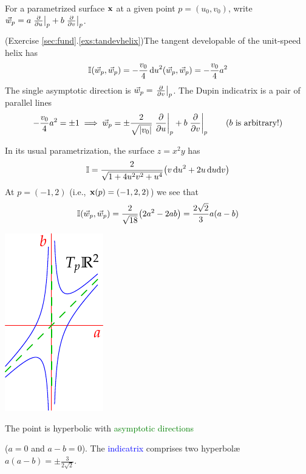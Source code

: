\begin{examples}{}{}
	For a parametrized surface ${\mathbf{x}}$ at a given point $p=(u_0,v_0)$, write $\vec w_p=\smash{a\left.\frac{\partial }{\partial u}\right|_{p}+b\left.\frac{\partial }{\partial v}\right|_{p}}$.
	\begin{enumerate}
	  \item (Exercise \ref*{sec:fund}.\ref{exs:tandevhelix})\lstsp The tangent developable of the unit-speed helix has
		\[
			\mathbb{I}(\vec w_p,\vec w_p) =-\frac{v_0}4\,{\mathrm{d} u}^2(\vec w_p,\vec w_p) =-\frac{v_0}4a^2
		\]
		The single asymptotic direction is $\vec w_p=\smash{\left.\frac{\partial }{\partial v}\right|_{p}}$. The Dupin indicatrix is a pair of parallel lines
		\[
			-\frac{v_0}4a^2=\pm 1\implies \vec w_p=\pm\frac 2{\sqrt{\left| v_0\right|}}\left.\frac{\partial }{\partial u}\right|_{p}+b\left.\frac{\partial }{\partial v}\right|_{p}
			\tag{$b$ is arbitrary!}
		\]
		
		\begin{minipage}[t]{0.75\linewidth}\vspace{-5pt}
			\item In its usual parametrization, the surface $z=x^2y$ has
			\[
				\mathbb{I}=\frac{2}{\sqrt{1+4u^2v^2+u^4}}\bigl(v\,{\mathrm{d} u}^2+2u\,{\mathrm{d} u}{\mathrm{d} v}\bigr)
			\]
			At $p=(-1,2)$ (i.e., ${\mathbf{x}}(p)=(-1,2,2)$) we see that
			\[
				\mathbb{I}(\vec w_p,\vec w_p) =\frac 2{\sqrt{18}}\bigl(2a^2-2ab\bigr) =\frac{2\sqrt 2}3a(a-b)
			\]
		\end{minipage}
		\hfill
		\begin{minipage}[t]{0.24\linewidth}\vspace{-5pt}
			\flushright\includegraphics{euler-indicatrix}\vspace{-20pt}
		\end{minipage}
		\par
		The point is hyperbolic with \textcolor{Green}{asymptotic directions} \par
		($a=0$ and $a-b=0$). The \textcolor{blue}{indicatrix} comprises two hyperbolæ $a(a-b)=\pm\frac 3{2\sqrt 2}$.
	\end{enumerate}
\end{examples}


